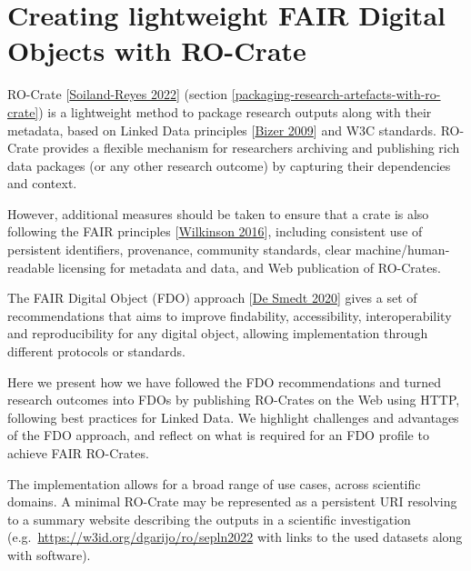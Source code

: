 \section{Creating lightweight FAIR Digital Objects with RO-Crate}

RO-Crate {[}\href{https://doi.org/10.3233/DS-210053}{Soiland-Reyes
2022}{]} (section \ref{packaging-research-artefacts-with-ro-crate}) is a lightweight method to package research outputs along with
their metadata, based on Linked Data principles
{[}\href{https://doi.org/10.4018/jswis.2009081901}{Bizer 2009}{]} and
W3C standards. RO-Crate provides a flexible mechanism for researchers
archiving and publishing rich data packages (or any other research
outcome) by capturing their dependencies and context.

However, additional measures should be taken to ensure that a crate is
also following the FAIR principles
{[}\href{https://doi.org/10.1038/sdata.2016.18}{Wilkinson 2016}{]},
including consistent use of persistent identifiers, provenance,
community standards, clear machine/human-readable licensing for metadata
and data, and Web publication of RO-Crates.

The FAIR Digital Object (FDO) approach
{[}\href{https://doi.org/10.3390/publications8020021}{De Smedt 2020}{]}
gives a set of recommendations that aims to improve findability,
accessibility, interoperability and reproducibility for any digital
object, allowing implementation through different protocols or
standards.

Here we present how we have followed the FDO recommendations and turned
research outcomes into FDOs by publishing RO-Crates on the Web using
HTTP, following best practices for Linked Data. We highlight challenges
and advantages of the FDO approach, and reflect on what is required for
an FDO profile to achieve FAIR RO-Crates.

The implementation allows for a broad range of use cases, across
scientific domains. A minimal RO-Crate may be represented as a
persistent URI resolving to a summary website describing the outputs in
a scientific investigation
(e.g.~\url{https://w3id.org/dgarijo/ro/sepln2022} with links to the used
datasets along with software).

